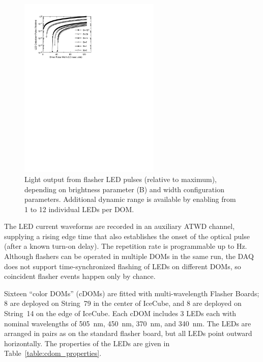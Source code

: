 \begin{figure}[h]
 \centering
 \includegraphics[width=0.6\textwidth]{graphics/dom/functional/domfig5-BrightnessModel.pdf}
 \caption{Light output from flasher LED pulses (relative to maximum), depending
on brightness parameter (B) and width configuration parameters.  Additional dynamic range is available
by enabling from 1 to 12 individual LEDs per DOM.}
 \label{fig:flasheroutput}
\end{figure}

The LED current waveforms are recorded in an auxiliary ATWD channel, supplying
a rising edge time that also establishes the onset of the optical pulse (after a known
turn-on delay).
The repetition rate is programmable up to \unit[610]{Hz}.
Although flashers can be
operated in multiple DOMs in the same run, the DAQ does not support
time-synchronized flashing of LEDs on different DOMs, so coincident flasher
events happen only by chance. 

Sixteen ``color DOMs'' (cDOMs) are fitted with multi-wavelength
Flasher Boards; 8 are deployed on String~79 in the center of IceCube, and 8
are deployed on String~14 on the edge of IceCube.  Each cDOM includes
3 LEDs each with nominal
wavelengths of 505~nm, 450~nm, 370~nm, and 340~nm. The LEDs are arranged in pairs as on the
standard flasher board, but all LEDs point outward horizontally. 
The properties of the LEDs are given in
Table~\ref{table:cdom_properties}.

